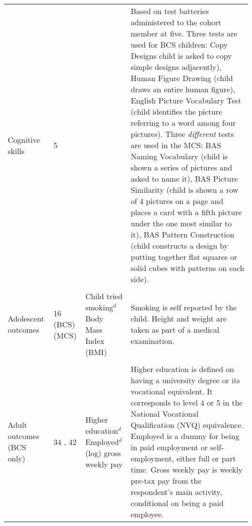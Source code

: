 \begin{landscape}
\begin{table}[ht!]
\begin{tabular}{L{.18\textwidth}C{.1\textwidth}L{.3\textwidth}L{.75\textwidth}}
Cognitive skills & 5 & & Based on test batteries administered to the cohort member at five. Three tests are used for BCS children: Copy Designs child is asked to copy simple designs adjacently), Human Figure Drawing (child draws an entire human figure), English Picture Vocabulary Test (child identifies the picture referring to a word among four pictures). Three \emph{different} tests are used in the MCS: BAS Naming Vocabulary (child is shown a series of pictures and asked to name it), BAS Picture Similarity (child is shown a row of 4 pictures on a page and places a card with a fifth picture under the one most similar to it), BAS Pattern Construction (child constructs a design by putting together flat squares or solid cubes with patterns on each side).

 \\ \\[-1.5em]
Adolescent outcomes & 16 (BCS)  (MCS) & Child tried smoking$^d$ \newline Body Mass Index (BMI) & Smoking is self reported by the child. Height and weight are taken as part of a medical examination. \\ \\[-1.5em]
Adult outcomes (BCS only) & 34  , 42 & Higher education$^d$ \newline Employed$^d$ \newline (log) gross weekly pay & Higher education is defined on having a university degree or its vocational equivalent. It corresponds to level 4 or 5 in the National Vocational Qualification (NVQ) equivalence. Employed is a dummy for being in paid employment or self-employment, either full or part time. Gross weekly pay is weekly pre-tax pay from the respondent's main activity, conditional on being a paid employee. \\
\bottomrule
\end{tabular}
\end{table}
\end{landscape}

